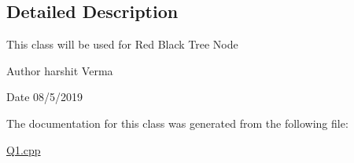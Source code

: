 \subsection{Detailed Description}
This class will be used for Red Black Tree Node \begin{DoxyAuthor}{Author}
harshit Verma 
\end{DoxyAuthor}
\begin{DoxyDate}{Date}
08/5/2019 
\end{DoxyDate}


The documentation for this class was generated from the following file\+:\begin{DoxyCompactItemize}
\item 
\hyperlink{Q1_8cpp}{Q1.\+cpp}\end{DoxyCompactItemize}
